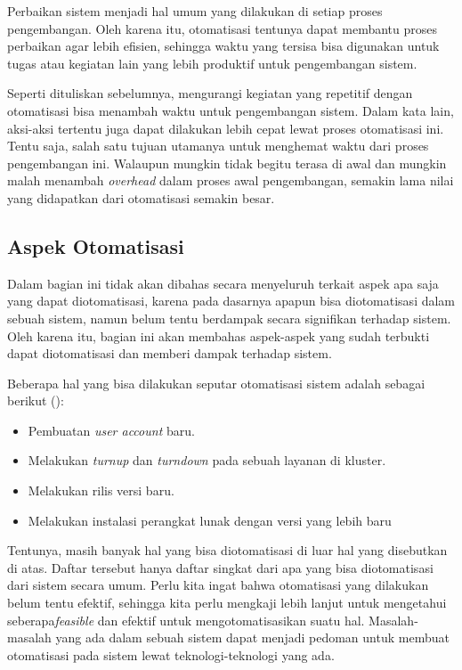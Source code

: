 Perbaikan sistem menjadi hal umum yang dilakukan di setiap proses pengembangan.
Oleh karena itu, otomatisasi tentunya dapat membantu proses perbaikan agar lebih efisien, sehingga waktu yang tersisa bisa digunakan untuk tugas atau kegiatan lain yang lebih produktif untuk pengembangan sistem.

Seperti dituliskan sebelumnya, mengurangi kegiatan yang repetitif dengan otomatisasi bisa menambah waktu untuk pengembangan sistem.
Dalam kata lain, aksi-aksi tertentu juga dapat dilakukan lebih cepat lewat proses otomatisasi ini.
Tentu saja, salah satu tujuan utamanya untuk menghemat waktu dari proses pengembangan ini.
Walaupun mungkin tidak begitu terasa di awal dan mungkin malah menambah \textit{overhead} dalam proses awal pengembangan, semakin lama nilai yang didapatkan dari otomatisasi semakin besar.

\subsection{Aspek Otomatisasi}
Dalam bagian ini tidak akan dibahas secara menyeluruh terkait aspek apa saja yang dapat diotomatisasi, karena pada dasarnya apapun bisa diotomatisasi dalam sebuah sistem, namun belum tentu berdampak secara signifikan terhadap sistem.
Oleh karena itu, bagian ini akan membahas aspek-aspek yang sudah terbukti dapat diotomatisasi dan memberi dampak terhadap sistem.

Beberapa hal yang bisa dilakukan seputar otomatisasi sistem adalah sebagai berikut (\cite{beyer2016site}):
\begin{itemize}
  \item Pembuatan \textit{user account} baru.
  \item Melakukan \textit{turnup} dan \textit{turndown} pada sebuah layanan di kluster.
  \item Melakukan rilis versi baru.
  \item Melakukan instalasi perangkat lunak dengan versi yang lebih baru
\end{itemize}

Tentunya, masih banyak hal yang bisa diotomatisasi di luar hal yang disebutkan di atas.
Daftar tersebut hanya daftar singkat dari apa yang bisa diotomatisasi dari sistem secara umum. 
Perlu kita ingat bahwa otomatisasi yang dilakukan belum tentu efektif, sehingga kita perlu mengkaji lebih lanjut untuk mengetahui seberapa\textit{feasible} dan efektif untuk mengotomatisasikan suatu hal.
Masalah-masalah yang ada dalam sebuah sistem dapat menjadi pedoman untuk membuat otomatisasi pada sistem lewat teknologi-teknologi yang ada.

